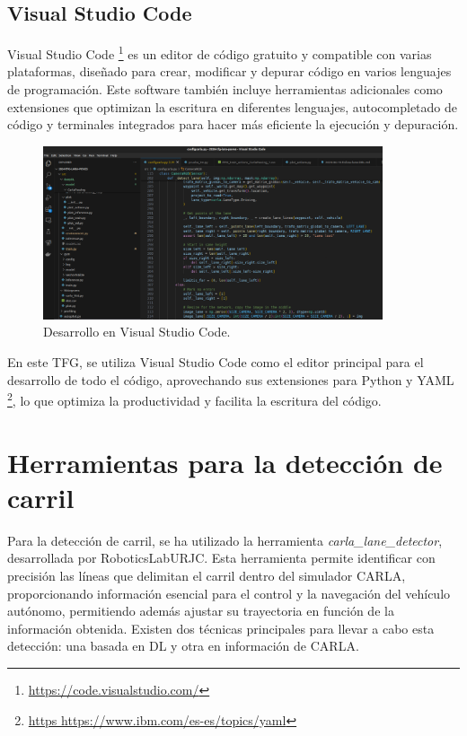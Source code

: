 \subsection{Visual Studio Code}
\label{sec:vs_code}

Visual Studio Code \footnote{\url{https://code.visualstudio.com/}} es un editor de código gratuito y compatible con varias plataformas, diseñado para crear, modificar y depurar código en varios lenguajes de programación. Este software también incluye herramientas adicionales como extensiones que optimizan la escritura en diferentes lenguajes, autocompletado de código y terminales integrados para hacer más eficiente la ejecución y depuración.

\begin{figure}[ht]
  \begin{center}
    \includegraphics[width=10cm]{figs/Plataformas_Desarollo/visual_code.png}
  \end{center}
  \caption{Desarrollo en Visual Studio Code.}
  \label{foto_code}
\end{figure}

En este \ac{TFG}, se utiliza Visual Studio Code como el editor principal para el desarrollo de todo el código, aprovechando sus extensiones para Python y YAML \footnote{\url{https https://www.ibm.com/es-es/topics/yaml}}, lo que optimiza la productividad y facilita la escritura del código.

\section{Herramientas para la detección de carril}
\label{sec:herr}

Para la detección de carril, se ha utilizado la herramienta \textit{carla\_lane\_detector}, desarrollada por RoboticsLabURJC. Esta herramienta permite identificar con precisión las líneas que delimitan el carril dentro del simulador CARLA, proporcionando información esencial para el control y la navegación del vehículo autónomo, permitiendo además ajustar su trayectoria en función de la información obtenida. Existen dos técnicas principales para llevar a cabo esta detección: una basada en \ac{DL} y otra en información de CARLA.

